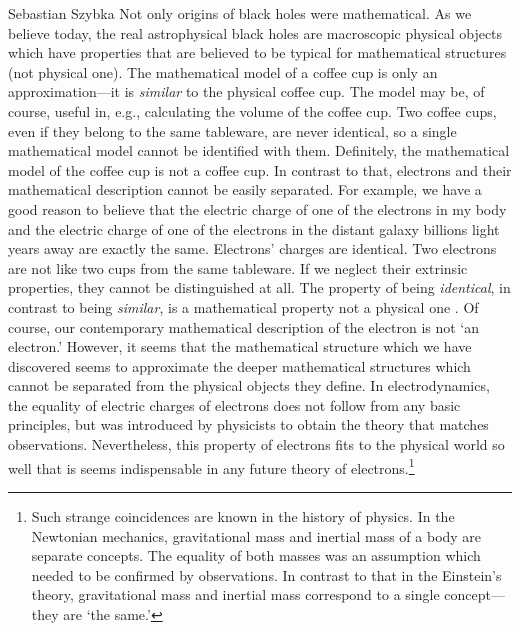 \begin{artengenv}{Sebastian Szybka}
Not only origins of black holes were mathematical. As we believe today, the real astrophysical black holes are macroscopic physical objects which have properties that are believed to be typical for mathematical structures (not physical one). The mathematical model of a coffee cup is only an approximation---it is \textit{similar} to the physical coffee cup. The model may be, of course, useful in, e.g., calculating the volume of the coffee cup. Two coffee cups, even if they belong to the same tableware, are never identical, so a single mathematical model cannot be identified with them. Definitely, the mathematical model of the coffee cup is not a coffee cup. In contrast to that, electrons and their mathematical description cannot be easily separated. For example, we have a good reason to believe that the electric charge of one of the electrons in my body and the electric charge of one of the electrons in the distant galaxy billions light years away are exactly the same. Electrons' charges are identical. Two electrons are not like two cups from the same tableware. If we neglect their extrinsic properties, they cannot be distinguished at all.  The property of being \textit{identical}, in contrast to being \textit{similar}, is a mathematical property not a physical one \parencite{staruszkiewicz_filozofia_2001}. Of course, our contemporary mathematical description of the electron is not `an electron.' However, it seems that the mathematical structure which we have discovered seems to approximate the deeper mathematical structures which cannot be separated from the physical objects they define. In electrodynamics, the equality of electric charges of electrons does not follow from any basic principles, but was introduced by physicists to obtain the theory that matches observations. Nevertheless, this property of electrons fits to the physical world so well that is seems indispensable in any future theory of electrons.\footnote{Such strange coincidences are known in the history of physics. In the Newtonian mechanics, gravitational mass and inertial mass of a body are separate concepts. The equality of both masses was an assumption which needed to be confirmed by observations. In contrast to that in the Einstein's theory, gravitational mass and inertial mass correspond to a single concept---they are `the same.'}


\end{artengenv}
